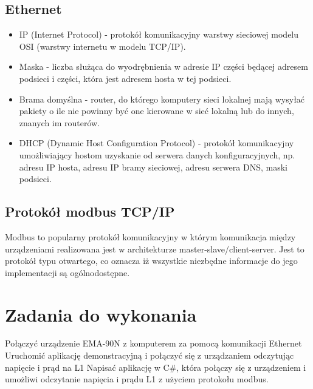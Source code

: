 \documentclass[a4paper,12pt]{extarticle}  %
\begin{document}
\subsection{Ethernet}
\begin{itemize}
	\item IP (Internet Protocol) - protokół komunikacyjny warstwy sieciowej modelu OSI (warstwy internetu w modelu TCP/IP).
	\item Maska - liczba służąca do wyodrębnienia w adresie IP części będącej adresem podsieci i części, która jest adresem hosta w tej podsieci. 
	\item Brama domyślna - router, do którego komputery sieci lokalnej mają wysyłać pakiety o ile nie powinny być one kierowane w sieć lokalną lub do innych, znanych im routerów.
	\item DHCP (Dynamic Host Configuration Protocol) - protokół komunikacyjny umożliwiający hostom uzyskanie od serwera danych konfiguracyjnych, np. adresu IP hosta, adresu IP bramy sieciowej, adresu serwera DNS, maski podsieci.
\end{itemize}
\subsection{Protokół modbus TCP/IP}
Modbus to popularny protokół komunikacyjny w którym komunikacja między urządzeniami realizowana jest w architekturze master-slave/client-server. 
Jest to protokół typu otwartego, co oznacza iż wszystkie niezbędne informacje do jego implementacji są ogólnodostępne.

\section{Zadania do wykonania}
Połączyć urządzenie EMA-90N z komputerem za pomocą komunikacji Ethernet
Uruchomić aplikację demonstracyjną i połączyć się z urządzaniem odczytując napięcie i prąd na L1
Napisać aplikację w C#, która połączy się z urządzeniem i umożliwi odczytanie napięcia i prądu L1 z użyciem protokołu modbus.
\end{document}
